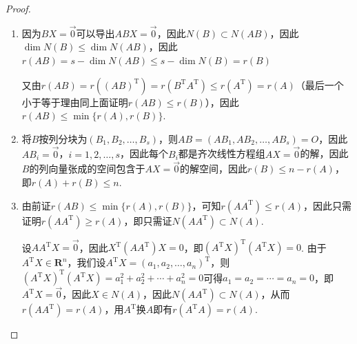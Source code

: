 \begin{proof}
    \begin{enumerate}
        \item 因为$BX=\vec{0}$可以导出$ABX=\vec{0}$，因此$N(B)\subset N(AB)$，因此$\dim N(B)\leqslant\dim N(AB)$，因此$r(AB)=s-\dim N(AB)\leqslant s-\dim N(B)=r(B)$

              又由$r(AB)=r((AB)^{\mathrm{T}})=r(B^{\mathrm{T}}A^{\mathrm{T}})\leqslant r(A^{\mathrm{T}})=r(A)$（最后一个小于等于理由同上面证明$r(AB)\leqslant r(B)$），因此$r(AB)\leqslant\min\{r(A),r(B)\}$.

        \item 将$B$按列分块为$(B_1,B_2,\ldots,B_s)$，则$AB=(AB_1,AB_2,\ldots,AB_s)=O$，因此$AB_i=\vec{0}$，$i=1,2,\ldots,s$，因此每个$B_i$都是齐次线性方程组$AX=\vec{0}$的解，因此$B$的列向量张成的空间包含于$AX=\vec{0}$的解空间，因此$r(B)\leqslant n-r(A)$，即$r(A)+r(B)\leqslant n$.

        \item 由前证$r(AB)\leqslant\min\{r(A),r(B)\}$，可知$r(AA^\mathrm{T})\leqslant r(A)$，因此只需证明$r(AA^\mathrm{T})\geqslant r(A)$，即只需证$N(AA^\mathrm{T})\subset N(A)$.

              设$AA^\mathrm{T}X=\vec{0}$，因此$X^\mathrm{T}(AA^\mathrm{T})X=0$，即$(A^\mathrm{T}X)^\mathrm{T}(A^\mathrm{T}X)=0$. 由于$A^\mathrm{T}X\in\mathbf{R}^n$，我们设$A^\mathrm{T}X=(a_1,a_2,\ldots,a_n)^\mathrm{T}$，则$(A^\mathrm{T}X)^\mathrm{T}(A^\mathrm{T}X)=a_1^2+a_2^2+\cdots+a_n^2=0$可得$a_1=a_2=\cdots=a_n=0$，即$A^\mathrm{T}X=\vec{0}$，因此$X \in N(A)$，因此$N(AA^\mathrm{T})\subset N(A)$，从而$r(AA^\mathrm{T})=r(A)$，用$A^\mathrm{T}$换$A$即有$r(A^\mathrm{T}A)=r(A)$.


\end{enumerate}
\end{proof}
